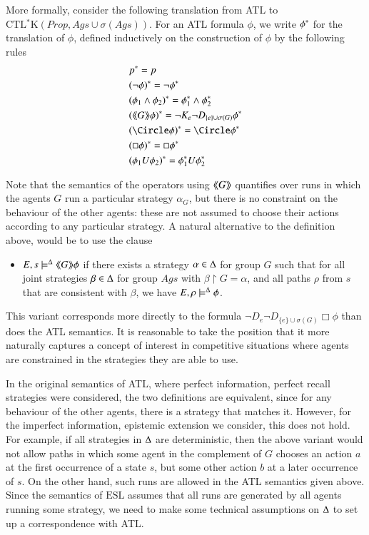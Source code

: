 \documentclass[a4wide]{article}
\newcommand{\CTLsK}{\mbox{CTL$^*$K}}
\newcommand{\ESL}{\mbox{ESL}}
\newcommand{\until}{U}
\newcommand{\Prop}{Prop}
\theoremstyle{examplesty}
\newcommand{\strat}{\sigma}
\newcommand{\Ags}{\mathit{Ags}}
\newcommand{\atlop}[1]{\langle\hspace{-2pt}\langle #1 \rangle \hspace{-2pt}\rangle }
\newcommand{\Env}{E}
\newcommand{\restrict}{\upharpoonright}
\newcommand{\nxt}{\Circle}
\newcommand{\always}{\Box}
\newcommand{\sgy}{\alpha}
\begin{document}
More formally, consider the following translation from 
ATL to 
$\CTLsK(\Prop,\Ags \cup \strat(\Ags))$. 
For an ATL formula $\phi$, 
we write $\phi^*$ for the translation of $\phi$, defined inductively on the construction of $\phi$ by 
the following rules 
\begin{align*} 
& \trl{p} = p \\
 &  \trl{(\neg \phi)} = \neg \trl{\phi} \\
 & \trl{(\phi_1\land \phi_2)} = \trl{\phi_1} \land \trl{\phi_2} \\ 
& \trl{(\atlop{G}\phi)} = \neg K_e \neg D_{\{e\} \cup \strat(G)}  \trl{\phi} \\
& \trl{(\nxt \phi)} = \nxt \trl{\phi} \\ 
& \trl{(\always \phi)} = \always \trl{\phi}\\ 
& \trl{(\phi_1 \until \phi_2)} = \trl{\phi_1} \until \trl{\phi_2} 
\end{align*} 

Note that the semantics of the operators using $\atlop{G}$ quantifies over runs in which the 
agents $G$ run a particular strategy $\sgy_G$, but there is no constraint on the behaviour of the other agents: these are 
not assumed to choose their actions according to any particular strategy. 
A natural alternative to the definition above, would be to use 
the clause 
\begin{itemize} 
\item[]
$\Env,s\models^\GStrats \atlop{G}
\phi$ if 
there exists a strategy $\sgy \in \GStrats$ for group $G$ 
such that for all joint strategies 
$\beta\in \Delta$ for group $\Ags$ 
with $\beta\restrict G = \sgy$, 
and all paths $\rho$ from $s$ that are consistent with $\beta$, 
we have  $\Env,\rho \models^\GStrats \phi$. 
\end{itemize} 
This variant corresponds more directly to the formula $ \neg D_{e} \neg D_{\{e\} \cup \strat(G)} \always \phi$
than does the ATL semantics. It is reasonable to take the position that it more naturally 
captures a concept of interest in competitive situations where agents are constrained in the 
strategies they are able to use. 

In the original semantics of ATL, where perfect information, perfect recall strategies were considered, 
the two definitions are equivalent, since for any behaviour of the other agents, there is a strategy that matches it. 
However, for the imperfect information, epistemic extension we consider, this does not hold. 
For example, if all strategies in $\Delta$ are deterministic, then the above variant would not allow paths in 
which some agent in the complement of $G$ chooses an action $a$ at the first occurrence of a state $s$, but some other action $b$ 
at a later occurrence of $s$. On the other hand, such runs are allowed in the ATL semantics given above. 
Since the semantics of $\ESL$ assumes that all runs are generated by all agents running some strategy, 
we need to make some technical assumptions on $\Delta$ to set up a correspondence with ATL. 
\end{document}
